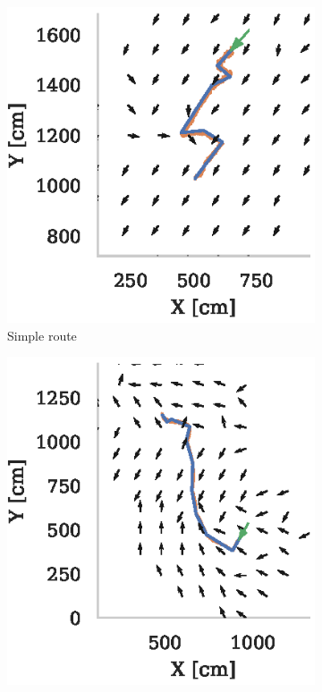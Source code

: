 \documentclass[letterpaper]{article}
\begin{document}
\begin{figure}[t]
    \centering
    \begin{subfigure}[t]{0.3\textwidth}
        \includegraphics{figures/vector_field_route2_PerfectMemory_mask.eps}
        \caption{Simple route}
        \label{fig:vector_fields/route2_perfect_memory_mask}
    \end{subfigure}
    \begin{subfigure}[t]{0.3\textwidth}
        \includegraphics{figures/vector_field_route5_PerfectMemory_mask.eps}

\end{subfigure}
\end{figure}
\end{document}
